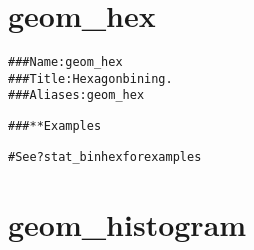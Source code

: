 \documentclass[a4paper,titlepage]{tufte-handout}\usepackage{graphicx, color}
\makeatletter
\newcommand{\hlcomment}[1]{\textcolor[rgb]{0.180392156862745,0.6,0.341176470588235}{#1}}%
\newenvironment{kframe}{%
 \def\at@end@of@kframe{}%
 \ifinner\ifhmode%
  \def\at@end@of@kframe{\end{minipage}}%
  \begin{minipage}{\columnwidth}%
 \fi\fi%
 \def\FrameCommand##1{\hskip\@totalleftmargin \hskip-\fboxsep
 \colorbox{shadecolor}{##1}\hskip-\fboxsep
     \hskip-\linewidth \hskip-\@totalleftmargin \hskip\columnwidth}%
 \MakeFramed {\advance\hsize-\width
   \@totalleftmargin\z@ \linewidth\hsize
   \@setminipage}}%
 {\par\unskip\endMakeFramed%
 \at@end@of@kframe}
\newenvironment{knitrout}{}{} %
\makeatother
\begin{document}
\section{geom\_hex}

\begin{knitrout}
\color{fgcolor}\begin{kframe}
\begin{alltt}
\hlcomment{### Name: geom_hex}
\hlcomment{### Title: Hexagon bining.}
\hlcomment{### Aliases: geom_hex}

\hlcomment{### ** Examples}

\hlcomment{# See ?stat_binhex for examples}



\end{alltt}
\end{kframe}
\end{knitrout}



\section{geom\_histogram}
\end{document}

